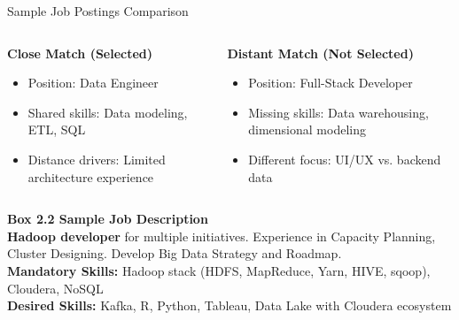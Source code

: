 \documentclass{beamer}
\begin{document}
\begin{frame}{Sample Job Postings Comparison}
\begin{columns}
\begin{column}{0.48\textwidth}
\begin{tcolorbox}[colback=boxbackground,colframe=boxframe,sharp corners]
\textbf{Close Match (Selected)}
\begin{itemize}
    \item Position: Data Engineer
    \item Shared skills: Data modeling, ETL, SQL
    \item Distance drivers: Limited architecture experience
\end{itemize}
\end{tcolorbox}
\end{column}
\begin{column}{0.48\textwidth}
\begin{tcolorbox}[colback=boxbackground,colframe=boxframe,sharp corners]
\textbf{Distant Match (Not Selected)}
\begin{itemize}
    \item Position: Full-Stack Developer
    \item Missing skills: Data warehousing, dimensional modeling
    \item Different focus: UI/UX vs. backend data
\end{itemize}
\end{tcolorbox}
\end{column}
\end{columns}

\vspace{0.5cm}
\begin{tcolorbox}[colback=boxbackground,colframe=boxframe,sharp corners]
\centering
\textbf{Box 2.2 Sample Job Description}\\
\small
\textbf{Hadoop developer} for multiple initiatives. Experience in Capacity Planning, Cluster Designing. Develop Big Data Strategy and Roadmap. \\
\textbf{Mandatory Skills:} Hadoop stack (HDFS, MapReduce, Yarn, HIVE, sqoop), Cloudera, NoSQL\\
\textbf{Desired Skills:} Kafka, R, Python, Tableau, Data Lake with Cloudera ecosystem
\end{tcolorbox}
\end{frame}
\end{document}
